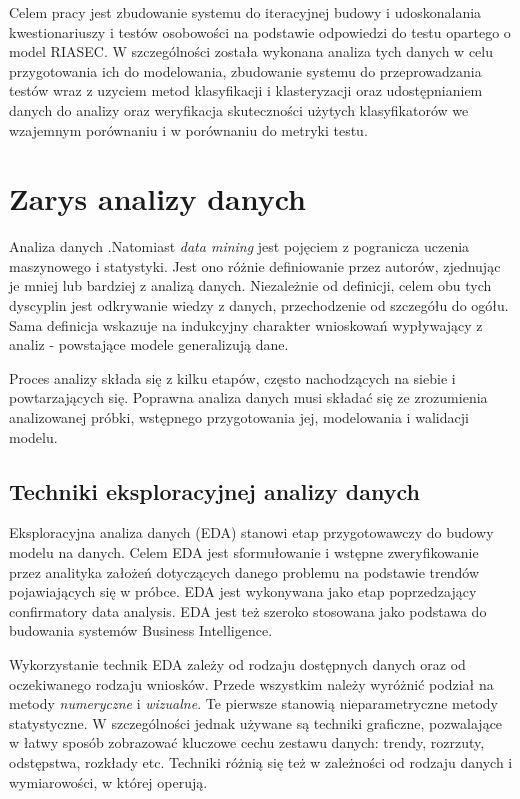 \documentclass[12pt,a4paper,oneside]{report} %
\begin{document}
Celem pracy jest zbudowanie systemu do iteracyjnej budowy i udoskonalania kwestionariuszy i testów osobowości na podstawie odpowiedzi do testu opartego o model RIASEC. W szczególności została wykonana analiza tych danych w celu przygotowania ich do modelowania, zbudowanie systemu do przeprowadzania testów wraz z uzyciem metod klasyfikacji i klasteryzacji oraz udostępnianiem danych do analizy oraz weryfikacja skuteczności użytych klasyfikatorów we wzajemnym porównaniu i w porównaniu do metryki testu.\par










\chapter{Zarys analizy danych}

Analiza danych 
.Natomiast \emph{data mining} jest pojęciem z pogranicza uczenia maszynowego i statystyki. Jest ono różnie definiowanie przez autorów, zjednując je mniej lub bardziej z analizą danych. Niezależnie od definicji, celem obu tych dyscyplin jest odkrywanie wiedzy z danych, przechodzenie od szczegółu do ogółu. Sama definicja wskazuje na indukcyjny charakter wnioskowań wypływający z analiz - powstające modele generalizują dane.

Proces analizy składa się z kilku etapów, często nachodzących na siebie i powtarzających się. Poprawna analiza danych musi składać się ze zrozumienia analizowanej próbki, wstępnego przygotowania jej, modelowania i walidacji modelu. 

\section{Techniki eksploracyjnej analizy danych}

Eksploracyjna analiza danych (EDA) stanowi etap przygotowawczy do budowy modelu na danych. Celem EDA jest sformułowanie i wstępne zweryfikowanie przez analityka założeń dotyczących danego problemu na podstawie trendów pojawiających się w próbce. EDA jest wykonywana jako etap poprzedzający confirmatory data analysis. EDA jest też szeroko stosowana jako podstawa do budowania systemów Business Intelligence.\cite{hseltman} \par 

Wykorzystanie technik EDA zależy od rodzaju dostępnych danych oraz od oczekiwanego rodzaju wniosków. Przede wszystkim należy wyróżnić podział na metody \emph{numeryczne} i \emph{wizualne}. Te pierwsze stanowią nieparametryczne metody statystyczne. W szczególności jednak używane są techniki graficzne, pozwalające w łatwy sposób zobrazować kluczowe cechu zestawu danych: trendy, rozrzuty, odstępstwa, rozkłady etc. Techniki różnią się też w zależności od rodzaju danych i wymiarowości, w której operują.\par
\end{document}
